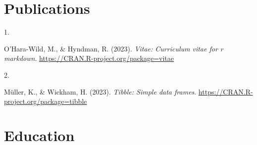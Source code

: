 \documentclass[10pt,a4paper,]{twentysecondcv}
\newlength{\csllabelwidth}
\newcommand{\CSLLeftMargin}[1]{\parbox[t]{\csllabelwidth}{#1}}
\newcommand{\CSLRightInline}[1]{\parbox[t]{\linewidth - \csllabelwidth}{#1}}
\begin{document}
\hypertarget{publications}{%
\section{Publications}\label{publications}}

\hypertarget{bibliography}{}
\leavevmode{}%
\CSLLeftMargin{1. }%
\CSLRightInline{O'Hara-Wild, M., \& Hyndman, R. (2023). \emph{Vitae:
Curriculum vitae for r markdown}.
\url{https://CRAN.R-project.org/package=vitae}}

\leavevmode{}%
\CSLLeftMargin{2. }%
\CSLRightInline{Müller, K., \& Wickham, H. (2023). \emph{Tibble: Simple
data frames}. \url{https://CRAN.R-project.org/package=tibble}}

\hypertarget{education}{%
\section{Education}\label{education}}

\nopagebreak

\begin{twenty}
\end{twenty}
\end{document}
